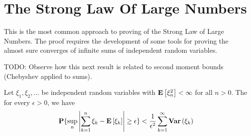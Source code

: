 \section{The Strong Law Of Large Numbers}

This is the most common approach to proving of the Strong Law of Large
Numbers.  The proof requires the development of some tools for proving
the almost sure converges of infinite sums of independent random
variables.

TODO: Observe how this next result is related to second moment bounds (Chebyshev
applied to sums).

\begin{lem}\label{KolmogorovMaximalInequality}Let
  $\xi_1, \xi_2, \dots$ be independent random variables with
  $\textbf{E}\left[\xi_n^2\right] < \infty$ for all $n>0$.  The for every
  $\epsilon > 0$, we have
\begin{align*}
\textbf{P}\{\sup_n \left \vert \sum_{k=1}^n \xi_k - \textbf{E}\left[\xi_k\right] \right \vert
  \geq \epsilon\} < \frac{1}{\epsilon^2} \sum_{k=1}^\infty \textbf{Var} \left (\xi_k \right )
\end{align*}
\end{lem}
